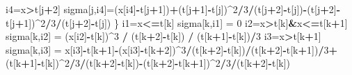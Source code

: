 \documentclass[11pt,]{article}
\newenvironment{Shaded}{\begin{snugshade}}{\end{snugshade}}
\newcommand{\DecValTok}[1]{\textcolor[rgb]{0.00,0.00,0.81}{#1}}
\newcommand{\StringTok}[1]{\textcolor[rgb]{0.31,0.60,0.02}{#1}}
\newcommand{\OperatorTok}[1]{\textcolor[rgb]{0.81,0.36,0.00}{\textbf{#1}}}
\newcommand{\NormalTok}[1]{#1}
\begin{document}
\begin{Shaded}
\begin{Highlighting}[]
\NormalTok{    i4=x}\OperatorTok{>}\NormalTok{t[j}\OperatorTok{+}\DecValTok{2}\NormalTok{]}
\NormalTok{    sigma[j,i4]=(x[i4]}\OperatorTok{-}\NormalTok{t[j}\OperatorTok{+}\DecValTok{1}\NormalTok{])}\OperatorTok{+}\NormalTok{(t[j}\OperatorTok{+}\DecValTok{1}\NormalTok{]}\OperatorTok{-}\NormalTok{t[j])}\OperatorTok{^}\DecValTok{2}\OperatorTok{/}\DecValTok{3}\OperatorTok{/}\NormalTok{(t[j}\OperatorTok{+}\DecValTok{2}\NormalTok{]}\OperatorTok{-}\NormalTok{t[j])}\OperatorTok{-}\NormalTok{(t[j}\OperatorTok{+}\DecValTok{2}\NormalTok{]}\OperatorTok{-}\NormalTok{t[j}\OperatorTok{+}\DecValTok{1}\NormalTok{])}\OperatorTok{^}\DecValTok{2}\OperatorTok{/}\DecValTok{3}\OperatorTok{/}\NormalTok{(t[j}\OperatorTok{+}\DecValTok{2}\NormalTok{]}\OperatorTok{-}\NormalTok{t[j])}
\NormalTok{  \}}
\NormalTok{  i1=x}\OperatorTok{<=}\NormalTok{t[k]}
\NormalTok{  sigma[k,i1] =}\StringTok{ }\DecValTok{0}
\NormalTok{  i2=x}\OperatorTok{>}\NormalTok{t[k]}\OperatorTok{&}\NormalTok{x}\OperatorTok{<=}\NormalTok{t[k}\OperatorTok{+}\DecValTok{1}\NormalTok{]}
\NormalTok{  sigma[k,i2] =}\StringTok{ }\NormalTok{(x[i2]}\OperatorTok{-}\NormalTok{t[k])}\OperatorTok{^}\DecValTok{3} \OperatorTok{/}\StringTok{ }\NormalTok{(t[k}\OperatorTok{+}\DecValTok{2}\NormalTok{]}\OperatorTok{-}\NormalTok{t[k]) }\OperatorTok{/}\StringTok{ }\NormalTok{(t[k}\OperatorTok{+}\DecValTok{1}\NormalTok{]}\OperatorTok{-}\NormalTok{t[k])}\OperatorTok{/}\DecValTok{3}
\NormalTok{  i3=x}\OperatorTok{>}\NormalTok{t[k}\OperatorTok{+}\DecValTok{1}\NormalTok{]}
\NormalTok{  sigma[k,i3] =}\StringTok{ }\NormalTok{x[i3]}\OperatorTok{-}\NormalTok{t[k}\OperatorTok{+}\DecValTok{1}\NormalTok{]}\OperatorTok{-}\NormalTok{(x[i3]}\OperatorTok{-}\NormalTok{t[k}\OperatorTok{+}\DecValTok{2}\NormalTok{])}\OperatorTok{^}\DecValTok{3}\OperatorTok{/}\NormalTok{(t[k}\OperatorTok{+}\DecValTok{2}\NormalTok{]}\OperatorTok{-}\NormalTok{t[k])}\OperatorTok{/}\NormalTok{(t[k}\OperatorTok{+}\DecValTok{2}\NormalTok{]}\OperatorTok{-}\NormalTok{t[k}\OperatorTok{+}\DecValTok{1}\NormalTok{])}\OperatorTok{/}\DecValTok{3}\OperatorTok{+}\NormalTok{(t[k}\OperatorTok{+}\DecValTok{1}\NormalTok{]}\OperatorTok{-}\NormalTok{t[k])}\OperatorTok{^}\DecValTok{2}\OperatorTok{/}\DecValTok{3}\OperatorTok{/}\NormalTok{(t[k}\OperatorTok{+}\DecValTok{2}\NormalTok{]}\OperatorTok{-}\NormalTok{t[k])}\OperatorTok{-}\NormalTok{(t[k}\OperatorTok{+}\DecValTok{2}\NormalTok{]}\OperatorTok{-}\NormalTok{t[k}\OperatorTok{+}\DecValTok{1}\NormalTok{])}\OperatorTok{^}\DecValTok{2}\OperatorTok{/}\DecValTok{3}\OperatorTok{/}\NormalTok{(t[k}\OperatorTok{+}\DecValTok{2}\NormalTok{]}\OperatorTok{-}\NormalTok{t[k])}

\end{Highlighting}
\end{Shaded}
\end{document}
